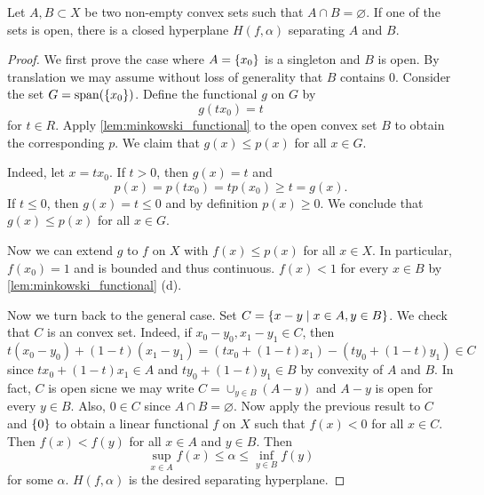 \begin{theorem}\label{thm:hahn_banach_separation_1}
    Let $A, B\subset X$ be two non-empty convex sets such that $A\cap B = \varnothing$. 
    If one of the sets is open, there is a closed hyperplane $H(f,\alpha)$ separating 
    $A$ and $B$. 
\end{theorem}
\begin{proof}
    We first prove the case where $A = \left\{ {x_0} \right\}$ is a singleton and $B$ is open. 
    By translation we may assume without loss of generality that $B$ contains $0$. 
    Consider the set $G = \operatorname{span}(\left\{ {x_0} \right\})$. Define the functional $g$ on $G$ by 
    \begin{equation*}
        g(tx_0) = t
    \end{equation*}
    for $t\in R$. Apply \cref{lem:minkowski_functional} to the open convex set 
    $B$ to obtain the corresponding $p$. We claim that $g(x) \leq p(x)$ for all 
    $x\in G$. 

    Indeed, let $x = tx_0$. If $t > 0$, then $g(x) = t$ and 
    \begin{equation*}
        p(x) = p(tx_0) = tp(x_0) \geq t = g(x).
    \end{equation*}
    If $t\leq 0$, then $g(x) = t\leq 0$ and by definition $p(x) \geq 0$. We 
    conclude that $g(x) \leq p(x)$ for all $x\in G$. 

    Now we can extend $g$ to $f$ on $X$ with $f(x)\leq p(x)$ for 
    all $x\in X$. In particular, $f(x_0) = 1$ and is bounded and thus 
    continuous. $f(x) < 1$ for every $x\in B$ by \cref{lem:minkowski_functional} 
    (d). 

    Now we turn back to the general case. Set $C = \left\{ x-y \;\middle\vert\; x\in A, y\in B \right\}$. 
    We check that $C$ is an convex set. Indeed, if $x_0-y_0, x_1-y_1\in C$, then 
    \begin{equation*}
        t(x_0-y_0) + (1-t)(x_1-y_1) = (tx_0 + (1-t)x_1) - (ty_0 + (1-t)y_1)\in C
    \end{equation*}
    since $tx_0 + (1-t)x_1\in A$ and $ty_0 + (1-t)y_1\in B$ by convexity of $A$ and $B$. 
    In fact, $C$ is open sicne we may write $C = \cup_{y\in B}(A-y)$ and $A-y$ is open 
    for every $y\in B$. Also, $0\in C$ since $A\cap B = \varnothing$. 
    Now apply the previous result to $C$ and $\left\{ {0} \right\}$ to obtain a 
    linear functional $f$ on $X$ such that $f(x) < 0$ for all $x\in C$. 
    Then $f(x) < f(y)$ for all $x\in A$ and $y\in B$. Then 
    \begin{equation*}
        \sup_{x\in A} f(x) \leq \alpha\leq \inf_{y\in B} f(y)
    \end{equation*}
    for some $\alpha$. $H(f,\alpha)$ is the desired separating hyperplane. 
\end{proof}

